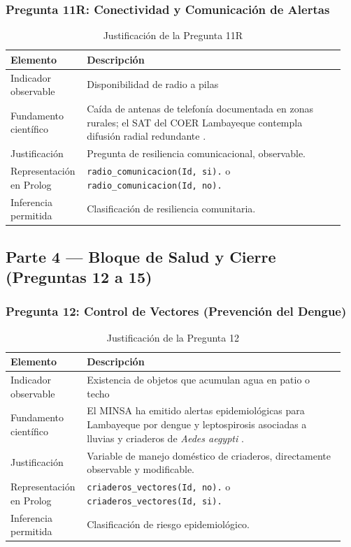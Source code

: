 \documentclass[12pt, letterpaper]{article}
\begin{document}
\subsubsection*{Pregunta 11R: Conectividad y Comunicación de Alertas}
\begin{table}[H]
\centering
\caption{Justificación de la Pregunta 11R}
\label{tab:p11r}
\begin{tabular}{@{}p{0.2\linewidth}p{0.75\linewidth}@{}}
\toprule
\textbf{Elemento} & \textbf{Descripción} \\ \midrule
Indicador observable & Disponibilidad de radio a pilas \\
Fundamento científico & Caída de antenas de telefonía documentada en zonas rurales; el SAT del COER Lambayeque contempla difusión radial redundante \parencite{cenepred_manual_evar}. \\
Justificación & Pregunta de resiliencia comunicacional, observable. \\
Representación en Prolog & \texttt{radio\_comunicacion(Id, si).} o \texttt{radio\_comunicacion(Id, no).} \\
Inferencia permitida & Clasificación de resiliencia comunitaria. \\ \bottomrule
\end{tabular}
\end{table}

\subsection{Parte 4 — Bloque de Salud y Cierre (Preguntas 12 a 15)}

\subsubsection*{Pregunta 12: Control de Vectores (Prevención del Dengue)}
\begin{table}[H]
\centering
\caption{Justificación de la Pregunta 12}
\label{tab:p12}
\begin{tabular}{@{}p{0.2\linewidth}p{0.75\linewidth}@{}}
\toprule
\textbf{Elemento} & \textbf{Descripción} \\ \midrule
Indicador observable & Existencia de objetos que acumulan agua en patio o techo \\
Fundamento científico & El MINSA ha emitido alertas epidemiológicas para Lambayeque por dengue y leptospirosis asociadas a lluvias y criaderos de \textit{Aedes aegypti} \parencite{minsa_alerta_2023}. \\
Justificación & Variable de manejo doméstico de criaderos, directamente observable y modificable. \\
Representación en Prolog & \texttt{criaderos\_vectores(Id, no).} o \texttt{criaderos\_vectores(Id, si).} \\
Inferencia permitida & Clasificación de riesgo epidemiológico. \\ \bottomrule
\end{tabular}
\end{table}
\end{document}
